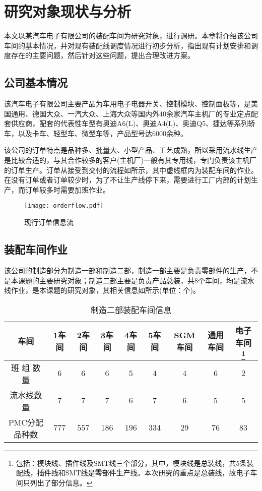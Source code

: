 \chapter{研究对象现状与分析}
本文以某汽车电子有限公司的装配车间为研究对象，进行调研。本章将介绍该公司车间的基本情况，并对现有装配线调度情况进行初步分析，指出现有计划安排和调度存在的主要问题，然后针对这些问题，提出合理改进方案。

\section{公司基本情况}
该汽车电子有限公司主要产品为车用电子电器开关、控制模块、控制面板等，是美国通用、德国大众、一汽大众、上海大众等国内外40余家汽车主机厂的专业定点配套供应商，配套的代表性车型有奥迪A6(L)、奥迪A4(L)、奥迪Q5、捷达等系列轿车，以及卡车、轻型车、微型车等，产品型号达6000余种。

该公司的订单特点是品种多、批量大、小型产品、工艺成熟，所以采用流水线生产是比较合适的，与其合作较多的客户(主机厂)一般有其专用线，专门负责该主机厂的订单生产。订单从接受到交付的流程如所示，其中虚线框内为装配车间的作业。在没有订单或者订单较少时，为了不让生产线停下来，需要进行工厂内部的计划生产，而订单较多时需要加班作业。
\begin{figure}[h]
\centering
\texttt{[image: orderflow.pdf]}
\caption{现行订单信息流\label{fig:orderflow}}
\end{figure}
\section{装配车间作业}
该公司的制造部分为制造一部和制造二部，制造一部主要是负责零部件的生产，不是本课题的主要研究对象；制造二部主要是负责产品总装，共8个车间，均是流水线作业，是本课题的研究对象，其相关信息如所示(单位：个)。
\begin{table}[htbp]
  \centering
  \caption{制造二部装配车间信息}
    \begin{tabular}{cccccccccc}
    \toprule
    \multicolumn{2}{c}{车间 } & 1车间   & 2车间   & 3车间   & 4车间   & 5车间   & SGM车间 & 通用车间  & 电子车间 \footnote{包括：模块线、插件线及SMT线三个部分，其中，模块线是总装线，共5条装配线，插件线和SMT线是零部件生产线。本次研究的重点是总装线，故电子车间只列出了部分信息。} \\
    \midrule
    \multicolumn{2}{c}{班 组 数 量} & $6$     & $6$     & $6$     & $5$     & $4$     & $4$     & $6$     & $2$ \\
    \multicolumn{2}{c}{流水线数量} & $7$     & $7$     & $7$     & $6$     & $7$     & $6$     & $5$     & $5$ \\
    \multicolumn{2}{c}{PMC分配品种数} & $777$   & $557$   & $186$   & $196$   & $334$   & $29$    & $76$    & $83$ \\
    \bottomrule
    \end{tabular}
  \label{tab:2jobshopinfo}
\end{table}

